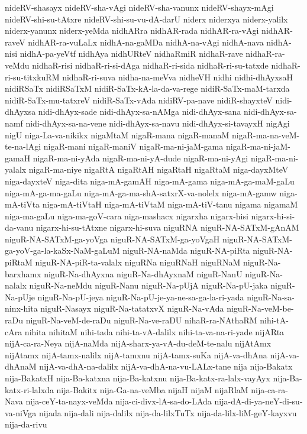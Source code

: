 {nideRV-shasayx
nideRV-sha-vAgi
nideRV-sha-vanunx
nideRV-shayx-mAgi
nideRV-shi-su-tAtxre
nideRV-shi-su-vu-dA-darU
niderx
niderxya
niderx-yalilx
niderx-yanunx
niderx-yeMda
nidhARra
nidhAR-rada
nidhAR-ra-vAgi
nidhAR-raveV
nidhAR-ra-vuLaLx
nidhA-na-gaMDa
nidhA-na-vAgi
nidhA-nava
nidhA-nisi
nidhA-pa-yeVtf
nidhAya
nidhURteV
nidhaRmiR
nidhaR-rave
nidhaR-ra-veMdu
nidhaR-risi
nidhaR-ri-si-dAga
nidhaR-ri-sida
nidhaR-ri-su-tatxde
nidhaR-ri-su-titxkuRM
nidhaR-ri-suva
nidha-na-meVva
nidheVH
nidhi
nidhi-dhAyxsaH
nidiRSaTx
nidiRSaTxM
nidiR-SaTx-kA-la-da-va-rege
nidiR-SaTx-maM-tarxda
nidiR-SaTx-mu-tatxreV
nidiR-SaTx-vAda
nidiRV-pa-nave
nidiR-shayxteV
nidi-dhAyxsa
nidi-dhAyx-sade
nidi-dhAyx-sa-nAMga
nidi-dhAyx-sana
nidi-dhAyx-sa-namf
nidi-dhAyx-sa-na-vene
nidi-dhAyx-sa-navu
nidi-dhAyx-si-tavayxH
nigAgi
nigU
niga-La-va-nikikx
nigaMtaM
nigaR-mana
nigaR-manaM
nigaR-ma-na-veM-te-na-lAgi
nigaR-mani
nigaR-maniV
nigaR-ma-ni-jaM-gama
nigaR-ma-ni-jaM-gamaH
nigaR-ma-ni-yAda
nigaR-ma-ni-yA-dude
nigaR-ma-ni-yAgi
nigaR-ma-ni-yalalx
nigaR-ma-niye
nigaRtA
nigaRtAH
nigaRtaH
nigaRtaM
niga-dayxMteV
niga-dayxteV
niga-dita
niga-mA-gamAH
niga-mA-gama
niga-mA-ga-maM-gaLu
niga-mA-ga-ma-gaLu
niga-mA-ga-ma-shA-satxrX-va-nolelx
niga-mA-gamw
niga-mA-tiVta
niga-mA-tiVtaH
niga-mA-tiVtaM
niga-mA-tiV-tanu
nigama
nigamaM
niga-ma-gaLu
niga-ma-goV-cara
niga-mashacx
nigarxha
nigarx-hisi
nigarx-hi-si-da-vanu
nigarx-hi-su-tAtxne
nigarx-hi-suva
niguRNA
niguR-NA-SATxM-gAnAM
niguR-NA-SATxM-ga-yoVga
niguR-NA-SATxM-ga-yoVgaH
niguR-NA-SATxM-ga-yoV-ga-la-kaSx-NaM-gaLuM
niguR-NA-naMda
niguR-NA-piRta
niguR-NA-piRtaM
niguR-NA-piR-ta-valalx
niguRNa
niguRNaH
niguRNaM
niguR-Na-barxhamx
niguR-Na-dhAyxna
niguR-Na-dhAyxnaM
niguR-NanU
niguR-Na-nalalx
niguR-Na-neMdu
niguR-Nanu
niguR-Na-pUjA
niguR-Na-pU-jaka
niguR-Na-pUje
niguR-Na-pU-jeya
niguR-Na-pU-je-ya-ne-sa-ga-la-ri-yada
niguR-Na-sa-ninx-hita
niguR-Nasayx
niguR-Na-tatatxvX
niguR-Na-vAda
niguR-Na-veM-be-raDu
niguR-Na-veM-de-raDu
niguR-Na-ve-raDU
nihaR-ra-NAthaRM
nihi-tA-cAra
nihita
nihitaM
nihi-tada
nihi-ta-vA-dalilx
nihi-ta-va-na-ri-yade
nijARta
nijA-ca-ra-Neya
nijA-naMda
nijA-sharx-ya-vA-du-deM-te-nalu
nijAtAmx
nijAtamx
nijA-tamx-nalilx
nijA-tamxnu
nijA-tamx-suKa
nijA-va-dhAna
nijA-va-dhAnaM
nijA-va-dhA-na-dalilx
nijA-va-dhA-na-vu-LALx-tane
nija
nija-Bakatx
nija-BakatxH
nija-Ba-katxna
nija-Ba-katxnu
nija-Ba-katx-ra-lalx-vayAyx
nija-Ba-katx-ri-lalxda
nija-Bakitx
nija-Ga-na-veMba
nijaH
nijaM
nijaRlaM
nija-ca-ra-Nava
nija-ceY-ta-nayx-veMda
nija-ci-divx-lA-sa-do-LAda
nija-dA-di-ya-neY-di-su-va-niVga
nijada
nija-dali
nija-dalilx
nija-da-lilxTuTx
nija-da-lilx-liM-geY-kayxvu
nija-da-rivu
}

